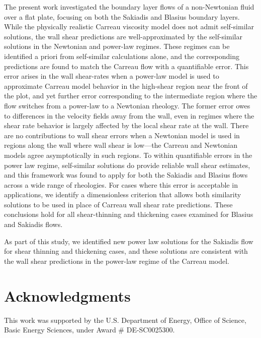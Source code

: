 \documentclass{article}
\begin{document}
The present work investigated the boundary layer flows of a non-Newtonian fluid over a flat plate, focusing on both the Sakiadis and Blasius boundary layers. While the physically realistic Carreau viscosity model does not admit self-similar solutions, the wall shear predictions are well-approximated by the self-similar solutions in the Newtonian and power-law regimes. These regimes can be identified a priori from self-similar calculations alone, and the corresponding predictions are found to match the Carreau flow with a quantifiable error. This error arises in the wall shear-rates when a power-law model is used to approximate Carreau model behavior in the high-shear region near the front of the plot, and yet further error corresponding to the intermediate region where the flow switches from a power-law to a Newtonian rheology. The former error owes to differences in the velocity fields away from the wall, even in regimes where the shear rate behavior is largely affected by the local shear rate at the wall. There are no contributions to wall shear errors when a Newtonian model is used in regions along the wall where wall shear is low---the Carreau and Newtonian models agree asymptotically in such regions. To within quantifiable errors in the power law regime, self-similar solutions do provide reliable wall shear estimates, and this framework was found to apply for both the Sakiadis and Blasius flows across a wide range of rheologies. For cases where this error is acceptable in applications, we identify a dimensionless criterion that allows both similarity solutions to be used in place of Carreau wall shear rate predictions. These conclusions hold for all shear-thinning and thickening cases examined for Blasius and Sakiadis flows.


As part of this study, we identified new power law solutions for the Sakiadis flow for shear thinning and thickening cases, and these solutions are consistent with the wall shear predictions in the power-law regime of the Carreau model.


\section*{Acknowledgments}

This work was supported by the U.S. Department of Energy, Office of Science, Basic Energy Sciences, under Award \# DE-SC0025300.

\end{document}
